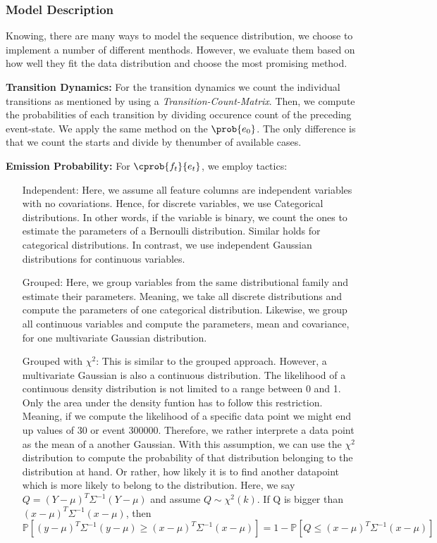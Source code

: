 \documentclass[./../../paper.tex]{subfiles}
\begin{document}
\subsubsection{Model Description}
Knowing, there are many ways to model the sequence distribution, we choose to implement a number of different menthods. However, we evaluate them based on how well they fit the data distribution and choose the most promising method.

\noindent\textbf{Transition Dynamics:} For the transition dynamics we count the individual transitions as mentioned by using a \emph{Transition-Count-Matrix}. Then, we compute the probabilities of each transition by dividing occurence count of the preceding event-state. We apply the same method on the $\prob{e_0}$. The only difference is that we count the starts and divide by thenumber of available cases.

\noindent\textbf{Emission Probability:} For $\cprob{f_t}{e_t}$, we employ  tactics:
\begin{enumerate}
    \item[Independent:] Here, we assume all feature columns are independent variables with no covariations. Hence, for discrete variables, we use Categorical distributions. In other words, if the variable is binary, we count the ones to estimate the parameters of a Bernoulli distribution. Similar holds for categorical distributions. In contrast, we use independent Gaussian distributions for continuous variables.
    \item[Grouped:] Here, we group variables from the same distributional family and estimate their parameters. Meaning, we take all discrete distributions and compute the parameters of one categorical distribution. Likewise, we group all continuous variables and compute the parameters, mean and covariance, for one multivariate Gaussian distribution.
    \item[Grouped with $\chi^2$:] This is similar to the grouped approach. However, a multivariate Gaussian is also a continuous distribution. The likelihood of a continuous density distribution is not limited to a range between 0 and 1. Only the area under the density funtion has to follow this restriction. Meaning, if we compute the likelihood of a specific data point we might end up values of 30 or event 300000. Therefore, we rather interprete a data point as the mean of a another Gaussian. With this assumption, we can use the $\chi^2$ distribution to compute the probability of that distribution belonging to the distribution at hand. Or rather, how likely it is to find another datapoint which is more likely to belong to the distribution. Here, we say $Q=(Y-\mu)^{T} \Sigma^{-1}(Y-\mu)$  and assume $Q \sim \chi^{2}(k)$. If Q is bigger than $(x-\mu)^{T} \Sigma^{-1}(x-\mu)$, then $\mathbb{P}\left[(y-\mu)^{T} \Sigma^{-1}(y-\mu) \geq(x-\mu)^{T} \Sigma^{-1}(x-\mu)\right]=1-\mathbb{P}\left[Q \leq(x-\mu)^{T} \Sigma^{-1}(x-\mu)\right]$
\end{enumerate}
\end{document}
